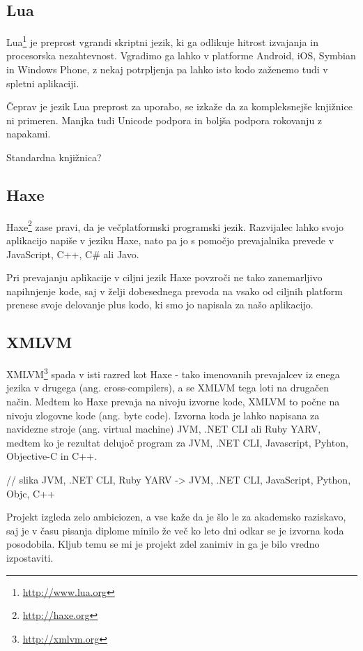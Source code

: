 \subsection{Lua}

Lua\footnote{\href{http://www.lua.org}{http://www.lua.org}} je preprost vgrandi skriptni jezik, ki ga odlikuje hitrost izvajanja in procesorska nezahtevnost. Vgradimo ga lahko v platforme Android, iOS, Symbian in Windows Phone, z nekaj potrpljenja pa lahko isto kodo zaženemo tudi v spletni aplikaciji.

Čeprav je jezik Lua preprost za uporabo, se izkaže da za kompleksnejše knjižnice ni primeren. Manjka tudi Unicode podpora in boljša podpora rokovanju z napakami.

Standardna knjižnica?

\subsection{Haxe}

Haxe\footnote{\href{http://haxe.org}{http://haxe.org}} zase pravi, da je večplatformski programski jezik. Razvijalec lahko svojo aplikacijo napiše v jeziku Haxe, nato pa jo s pomočjo prevajalnika prevede v JavaScript, C++, C\# ali Javo.

Pri prevajanju aplikacije v ciljni jezik Haxe povzroči ne tako zanemarljivo napihnjenje kode, saj v želji dobesednega prevoda na vsako od ciljnih platform prenese svoje delovanje plus kodo, ki smo jo napisala za našo aplikacijo.

\subsection{XMLVM}

XMLVM\footnote{\href{http://xmlvm.org}{http://xmlvm.org}} spada v isti razred kot Haxe - tako imenovanih prevajalcev iz enega jezika v drugega (ang. cross-compilers), a se XMLVM tega loti na drugačen način. Medtem ko Haxe prevaja na nivoju izvorne kode, XMLVM to počne na nivoju zlogovne kode (ang. byte code). Izvorna koda je lahko napisana za navidezne stroje (ang. virtual machine) JVM, .NET CLI ali Ruby YARV, medtem ko je rezultat delujoč program za JVM, .NET CLI, Javascript, Pyhton, Objective-C in C++.

// slika JVM, .NET CLI, Ruby YARV -> JVM, .NET CLI, JavaScript, Python, Objc, C++

Projekt izgleda zelo ambiciozen, a vse kaže da je šlo le za akademsko raziskavo, saj je v času pisanja diplome minilo že več ko leto dni odkar se je izvorna koda posodobila. Kljub temu se mi je projekt zdel zanimiv in ga je bilo vredno izpostaviti.

